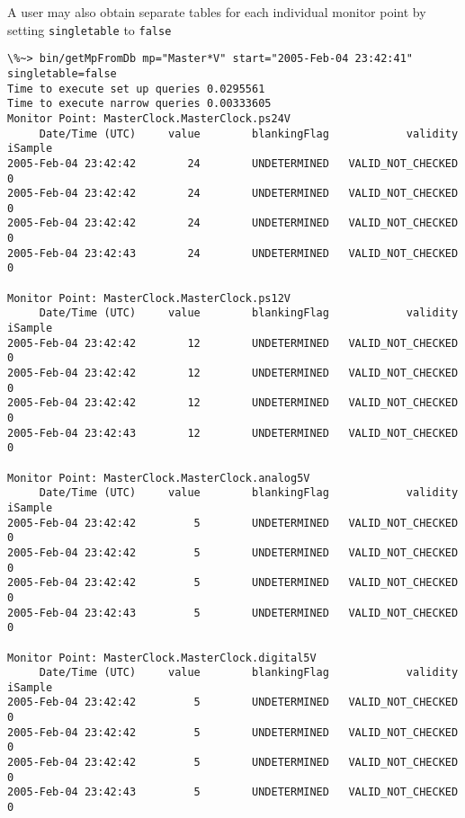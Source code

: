 \documentclass[preprint]{aastex}
\begin{document}
A user may also obtain separate tables for each individual monitor
point by setting {\tt singletable} to {\tt false}

\begin{verbatim}
\%~> bin/getMpFromDb mp="Master*V" start="2005-Feb-04 23:42:41" singletable=false
Time to execute set up queries 0.0295561
Time to execute narrow queries 0.00333605
Monitor Point: MasterClock.MasterClock.ps24V
     Date/Time (UTC)     value        blankingFlag            validity    iSample
2005-Feb-04 23:42:42        24        UNDETERMINED   VALID_NOT_CHECKED          0
2005-Feb-04 23:42:42        24        UNDETERMINED   VALID_NOT_CHECKED          0
2005-Feb-04 23:42:42        24        UNDETERMINED   VALID_NOT_CHECKED          0
2005-Feb-04 23:42:43        24        UNDETERMINED   VALID_NOT_CHECKED          0

Monitor Point: MasterClock.MasterClock.ps12V
     Date/Time (UTC)     value        blankingFlag            validity    iSample
2005-Feb-04 23:42:42        12        UNDETERMINED   VALID_NOT_CHECKED          0
2005-Feb-04 23:42:42        12        UNDETERMINED   VALID_NOT_CHECKED          0
2005-Feb-04 23:42:42        12        UNDETERMINED   VALID_NOT_CHECKED          0
2005-Feb-04 23:42:43        12        UNDETERMINED   VALID_NOT_CHECKED          0

Monitor Point: MasterClock.MasterClock.analog5V
     Date/Time (UTC)     value        blankingFlag            validity    iSample
2005-Feb-04 23:42:42         5        UNDETERMINED   VALID_NOT_CHECKED          0
2005-Feb-04 23:42:42         5        UNDETERMINED   VALID_NOT_CHECKED          0
2005-Feb-04 23:42:42         5        UNDETERMINED   VALID_NOT_CHECKED          0
2005-Feb-04 23:42:43         5        UNDETERMINED   VALID_NOT_CHECKED          0

Monitor Point: MasterClock.MasterClock.digital5V
     Date/Time (UTC)     value        blankingFlag            validity    iSample
2005-Feb-04 23:42:42         5        UNDETERMINED   VALID_NOT_CHECKED          0
2005-Feb-04 23:42:42         5        UNDETERMINED   VALID_NOT_CHECKED          0
2005-Feb-04 23:42:42         5        UNDETERMINED   VALID_NOT_CHECKED          0
2005-Feb-04 23:42:43         5        UNDETERMINED   VALID_NOT_CHECKED          0
\end{verbatim}
\end{document}

